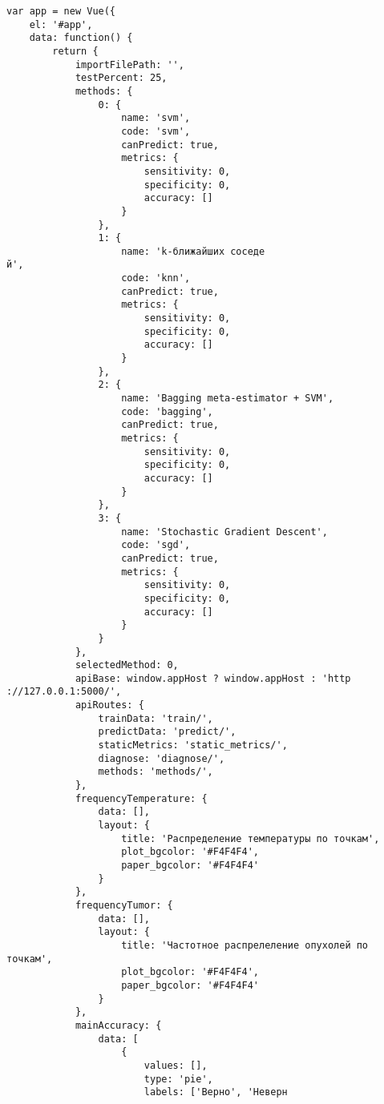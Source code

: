 \begin{verbatim}
var app = new Vue({
    el: '#app',
    data: function() {
        return {
            importFilePath: '',
            testPercent: 25,
            methods: {
                0: {
                    name: 'svm',
                    code: 'svm',
                    canPredict: true,
                    metrics: {
                        sensitivity: 0,
                        specificity: 0,
                        accuracy: []
                    }
                },
                1: {
                    name: 'k-ближайших соседе
й',
                    code: 'knn',
                    canPredict: true,
                    metrics: {
                        sensitivity: 0,
                        specificity: 0,
                        accuracy: []
                    }
                },
                2: {
                    name: 'Bagging meta-estimator + SVM',
                    code: 'bagging',
                    canPredict: true,
                    metrics: {
                        sensitivity: 0,
                        specificity: 0,
                        accuracy: []
                    }
                },
                3: {
                    name: 'Stochastic Gradient Descent',
                    code: 'sgd',
                    canPredict: true,
                    metrics: {
                        sensitivity: 0,
                        specificity: 0,
                        accuracy: []
                    }
                }
            },
            selectedMethod: 0,
            apiBase: window.appHost ? window.appHost : 'http
://127.0.0.1:5000/',
            apiRoutes: {
                trainData: 'train/',
                predictData: 'predict/',
                staticMetrics: 'static_metrics/',
                diagnose: 'diagnose/',
                methods: 'methods/',
            },
            frequencyTemperature: {
                data: [],
                layout: {
                    title: 'Распределение температуры по точкам',
                    plot_bgcolor: '#F4F4F4',
                    paper_bgcolor: '#F4F4F4'
                }
            },
            frequencyTumor: {
                data: [],
                layout: {
                    title: 'Частотное распрелеление опухолей по точкам',
                    plot_bgcolor: '#F4F4F4',
                    paper_bgcolor: '#F4F4F4'
                }
            },
            mainAccuracy: {
                data: [
                    {
                        values: [],
                        type: 'pie',
                        labels: ['Верно', 'Неверн

\end{verbatim}
